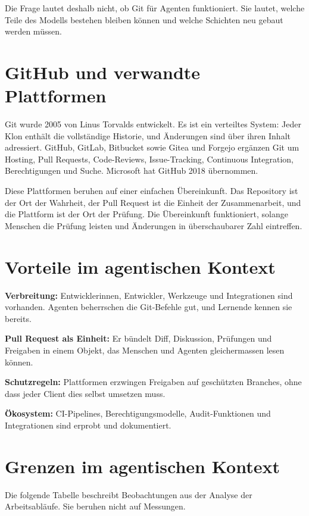 Die Frage lautet deshalb nicht, ob Git für Agenten funktioniert. Sie lautet, welche Teile des Modells bestehen bleiben können und welche Schichten neu gebaut werden müssen.

\section{GitHub und verwandte Plattformen}

Git wurde 2005 von Linus Torvalds entwickelt. Es ist ein verteiltes System: Jeder Klon enthält die vollständige Historie, und Änderungen sind über ihren Inhalt adressiert. GitHub, GitLab, Bitbucket sowie Gitea und Forgejo ergänzen Git um Hosting, Pull Requests, Code-Reviews, Issue-Tracking, Continuous Integration, Berechtigungen und Suche. Microsoft hat GitHub 2018 übernommen.

Diese Plattformen beruhen auf einer einfachen Übereinkunft. Das Repository ist der Ort der Wahrheit, der Pull Request ist die Einheit der Zusammenarbeit, und die Plattform ist der Ort der Prüfung. Die Übereinkunft funktioniert, solange Menschen die Prüfung leisten und Änderungen in überschaubarer Zahl eintreffen.

\section{Vorteile im agentischen Kontext}

\startitemize
\item \textbf{Verbreitung:} Entwicklerinnen, Entwickler, Werkzeuge und Integrationen sind vorhanden. Agenten beherrschen die Git-Befehle gut, und Lernende kennen sie bereits.
\item \textbf{Pull Request als Einheit:} Er bündelt Diff, Diskussion, Prüfungen und Freigaben in einem Objekt, das Menschen und Agenten gleichermassen lesen können.
\item \textbf{Schutzregeln:} Plattformen erzwingen Freigaben auf geschützten Branches, ohne dass jeder Client dies selbst umsetzen muss.
\item \textbf{Ökosystem:} CI-Pipelines, Berechtigungsmodelle, Audit-Funktionen und Integrationen sind erprobt und dokumentiert.
\stopitemize

\section{Grenzen im agentischen Kontext}

Die folgende Tabelle beschreibt Beobachtungen aus der Analyse der Arbeitsabläufe. Sie beruhen nicht auf Messungen.

